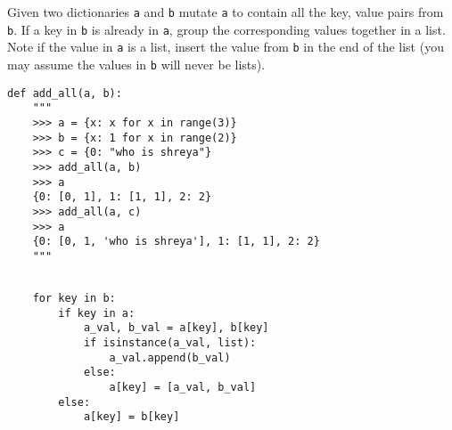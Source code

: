 \question Given two dictionaries
\texttt{a} and \texttt{b} mutate \texttt{a} to contain all the key, value pairs from \texttt{b}. If a key in \texttt{b} is already in \texttt{a}, group the corresponding values together in a list. Note if the value in \texttt{a} is a list, insert the value from \texttt{b} in the end of the list (you may assume the values in \texttt{b} will never be lists).

\begin{lstlisting}
def add_all(a, b):
    """
    >>> a = {x: x for x in range(3)}
    >>> b = {x: 1 for x in range(2)}
    >>> c = {0: "who is shreya"}
    >>> add_all(a, b)
    >>> a
    {0: [0, 1], 1: [1, 1], 2: 2}
    >>> add_all(a, c)
    >>> a
    {0: [0, 1, 'who is shreya'], 1: [1, 1], 2: 2}
    """
    
\end{lstlisting}
\begin{solution}[1.8in]
\begin{lstlisting}
    for key in b:
        if key in a:
            a_val, b_val = a[key], b[key]
            if isinstance(a_val, list):
                a_val.append(b_val)
            else:
                a[key] = [a_val, b_val]
        else:
            a[key] = b[key]
\end{lstlisting}
\end{solution}
